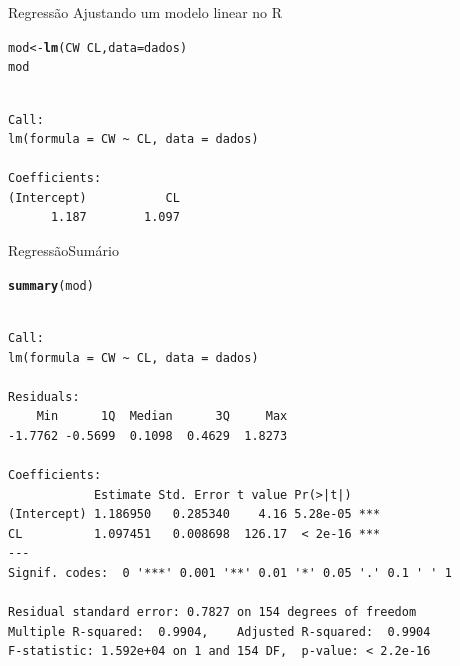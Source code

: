 \documentclass[10pt]{beamer}\usepackage[]{graphicx}\usepackage[]{color}
\makeatletter
\newcommand{\hlopt}[1]{\textcolor[rgb]{0,0,0}{#1}}%
\newcommand{\hlstd}[1]{\textcolor[rgb]{0.345,0.345,0.345}{#1}}%
\newcommand{\hlkwb}[1]{\textcolor[rgb]{0.69,0.353,0.396}{#1}}%
\newcommand{\hlkwc}[1]{\textcolor[rgb]{0.333,0.667,0.333}{#1}}%
\newcommand{\hlkwd}[1]{\textcolor[rgb]{0.737,0.353,0.396}{\textbf{#1}}}%
\newenvironment{kframe}{%
 \def\at@end@of@kframe{}%
 \ifinner\ifhmode%
  \def\at@end@of@kframe{\end{minipage}}%
  \begin{minipage}{\columnwidth}%
 \fi\fi%
 \def\FrameCommand##1{\hskip\@totalleftmargin \hskip-\fboxsep
 \colorbox{shadecolor}{##1}\hskip-\fboxsep
     \hskip-\linewidth \hskip-\@totalleftmargin \hskip\columnwidth}%
 \MakeFramed {\advance\hsize-\width
   \@totalleftmargin\z@ \linewidth\hsize
   \@setminipage}}%
 {\par\unskip\endMakeFramed%
 \at@end@of@kframe}
\newenvironment{knitrout}{}{} %
\providecommand{\R}{\textsf{R}\xspace}
\theoremstyle{definition}
\makeatother
\begin{document}
\begin{frame}[fragile]{Regressão}
Ajustando um modelo linear no \R
\begin{knitrout}\footnotesize
{}\color{fgcolor}\begin{kframe}
\begin{alltt}
\hlstd{mod} \hlkwb{<-} \hlkwd{lm}\hlstd{(CW} \hlopt{~} \hlstd{CL,} \hlkwc{data} \hlstd{= dados)}
\hlstd{mod}
\end{alltt}
\begin{verbatim}

Call:
lm(formula = CW ~ CL, data = dados)

Coefficients:
(Intercept)           CL  
      1.187        1.097  
\end{verbatim}
\end{kframe}
\end{knitrout}
\end{frame}

\begin{frame}[fragile]{Regressão}{Sumário}
\begin{knitrout}\footnotesize
{}\color{fgcolor}\begin{kframe}
\begin{alltt}
\hlkwd{summary}\hlstd{(mod)}
\end{alltt}
\begin{verbatim}

Call:
lm(formula = CW ~ CL, data = dados)

Residuals:
    Min      1Q  Median      3Q     Max 
-1.7762 -0.5699  0.1098  0.4629  1.8273 

Coefficients:
            Estimate Std. Error t value Pr(>|t|)    
(Intercept) 1.186950   0.285340    4.16 5.28e-05 ***
CL          1.097451   0.008698  126.17  < 2e-16 ***
---
Signif. codes:  0 '***' 0.001 '**' 0.01 '*' 0.05 '.' 0.1 ' ' 1

Residual standard error: 0.7827 on 154 degrees of freedom
Multiple R-squared:  0.9904,	Adjusted R-squared:  0.9904 
F-statistic: 1.592e+04 on 1 and 154 DF,  p-value: < 2.2e-16
\end{verbatim}
\end{kframe}
\end{knitrout}
\end{frame}
\end{document}
